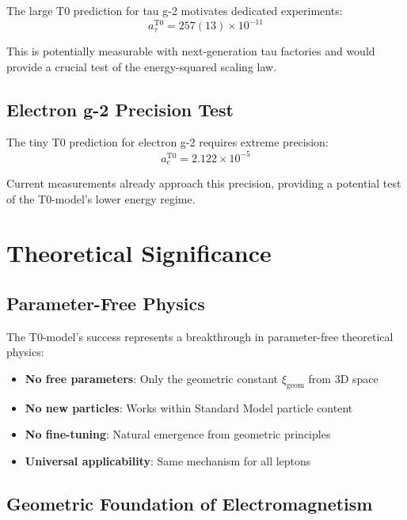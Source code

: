 \documentclass[12pt,a4paper]{report}
\newcommand{\xigeom}{\xi_{\text{geom}}}   %
\begin{document}
The large T0 prediction for tau g-2 motivates dedicated experiments:
\begin{equation}
	a_\tau^{\text{T0}} = 257(13) \times 10^{-11}
	\label{eq:tau_prediction}
\end{equation}

This is potentially measurable with next-generation tau factories and would provide a crucial test of the energy-squared scaling law.

\subsection{Electron g-2 Precision Test}
\label{subsec:electron_g2_precision}

The tiny T0 prediction for electron g-2 requires extreme precision:
\begin{equation}
	a_e^{\text{T0}} = 2.122 \times 10^{-5}
	\label{eq:electron_prediction}
\end{equation}

Current measurements already approach this precision, providing a potential test of the T0-model's lower energy regime.

\section{Theoretical Significance}
\label{sec:theoretical_significance}

\subsection{Parameter-Free Physics}
\label{subsec:parameter_free_physics}

The T0-model's success represents a breakthrough in parameter-free theoretical physics:
\begin{itemize}
	\item \textbf{No free parameters}: Only the geometric constant $\xigeom$ from 3D space
	\item \textbf{No new particles}: Works within Standard Model particle content
	\item \textbf{No fine-tuning}: Natural emergence from geometric principles
	\item \textbf{Universal applicability}: Same mechanism for all leptons
\end{itemize}

\subsection{Geometric Foundation of Electromagnetism}
\label{subsec:geometric_electromagnetism}
\end{document}
